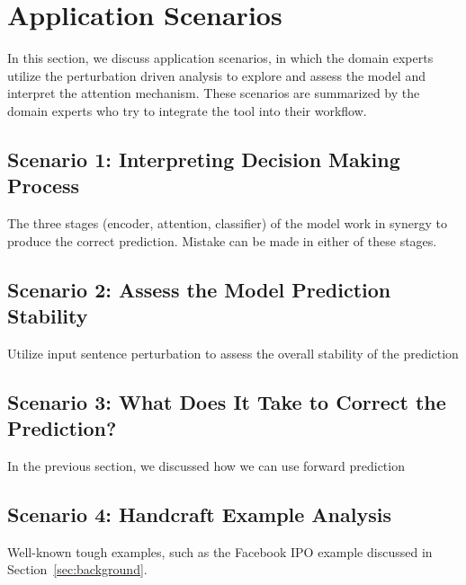 \section{Application Scenarios}
\label{sec:caseStudy}
In this section, we discuss application scenarios, in which the domain experts utilize the perturbation driven analysis to explore and assess the model and interpret the attention mechanism.
These scenarios are summarized by the domain experts who try to integrate the tool into their workflow.

\subsection{Scenario 1: Interpreting Decision Making Process}
The three stages (encoder, attention, classifier) of the model work in synergy to produce the correct prediction.
%
Mistake can be made in either of these stages.

\subsection{Scenario 2: Assess the Model Prediction Stability}
Utilize input sentence perturbation to assess the overall stability of the prediction

\subsection{Scenario 3: What Does It Take to Correct the Prediction?}
In the previous section, we discussed how we can use forward prediction

\subsection{Scenario 4: Handcraft Example Analysis}
Well-known tough examples, such as the Facebook IPO example discussed in Section~\ref{sec:background}.

